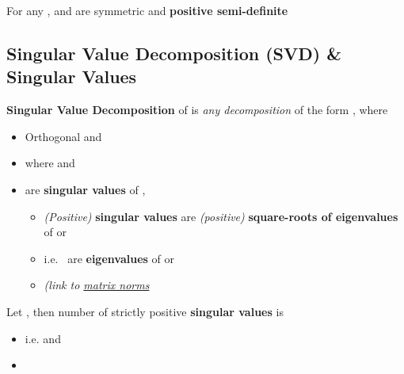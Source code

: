 \hSep %

For any ,  and
 are symmetric and \textbf{positive semi-definite}

\subsection*{Singular Value Decomposition (SVD) \& Singular Values}


\textbf{Singular Value Decomposition} of
 is \emph{any decomposition} of
the form , where

\begin{itemize}

      \item
            Orthogonal 
            and 
      \item
            where  and
            \tcbbreak
      \item
             are \textbf{singular values}
            of ,

            \begin{itemize}

                  \item
                        \emph{(Positive)} \textbf{singular values} are \emph{(positive)}
                        \textbf{square-roots of eigenvalues} of  or
                  \item
                        i.e.~ are
                        \textbf{eigenvalues} of  or 
                  \item
                         \emph{(link to
                              \underline{matrix norms}}
            \end{itemize}
\end{itemize}

Let , then number of strictly positive
\textbf{singular values} is 

\begin{itemize}

      \item
            i.e.  and
      \item
\end{itemize}

